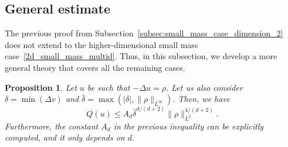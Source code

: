 \documentclass[11pt,a4paper]{article}
\numberwithin{equation}{section}
\theoremstyle{plain}
\newtheorem{proposition}[theorem]{Proposition}
\theoremstyle{remark}
\begin{document}
\subsection{General estimate}

The previous proof from Subsection~\ref{subsec:small_mass_case_dimension_2} does not extend to the higher-dimensional small mass case~\ref{2d_small_mass_multid}. 
Thus, in this subsection, we develop a more general theory that covers all the remaining cases.
\begin{proposition}
\label{prop:estimate_Linf_difference_full_mass_multid}
Let $u$ be such that $-\Delta u=\rho$. Let us also consider $\delta = \min(\Delta v)$ and $\bar{\delta}=\max(|\delta|,\|\rho\|_{L^{\infty}})$. Then, we have
$$
Q(u) \le A_d\bar\delta^{d/(d+2)}\|\rho\|_{L^2}^{4/(d+2)}.
$$
Furthermore, the constant $A_d$ in the previous inequality can be explicitly computed, and it only depends on $d$.
\end{proposition}
\end{document}

